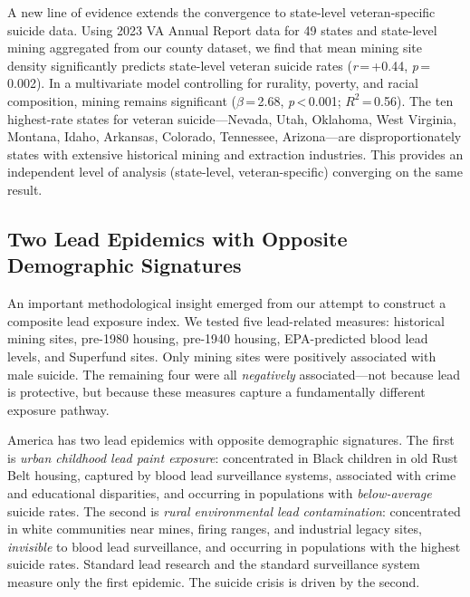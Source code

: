 \documentclass[11pt,twocolumn]{article}
\begin{document}
A new line of evidence extends the convergence to state-level veteran-specific suicide data. Using 2023 VA Annual Report data for 49 states and state-level mining aggregated from our county dataset, we find that mean mining site density significantly predicts state-level veteran suicide rates (\textit{r}\,=\,+0.44, \textit{p}\,=\,0.002). In a multivariate model controlling for rurality, poverty, and racial composition, mining remains significant ($\beta$\,=\,2.68, \textit{p}\,<\,0.001; $R^2$\,=\,0.56). The ten highest-rate states for veteran suicide---Nevada, Utah, Oklahoma, West Virginia, Montana, Idaho, Arkansas, Colorado, Tennessee, Arizona---are disproportionately states with extensive historical mining and extraction industries. This provides an independent level of analysis (state-level, veteran-specific) converging on the same result.

\subsection{Two Lead Epidemics with Opposite Demographic Signatures}

An important methodological insight emerged from our attempt to construct a composite lead exposure index. We tested five lead-related measures: historical mining sites, pre-1980 housing, pre-1940 housing, EPA-predicted blood lead levels, and Superfund sites. Only mining sites were positively associated with male suicide. The remaining four were all \textit{negatively} associated---not because lead is protective, but because these measures capture a fundamentally different exposure pathway.

America has two lead epidemics with opposite demographic signatures. The first is \textit{urban childhood lead paint exposure}: concentrated in Black children in old Rust Belt housing, captured by blood lead surveillance systems, associated with crime and educational disparities, and occurring in populations with \textit{below-average} suicide rates. The second is \textit{rural environmental lead contamination}: concentrated in white communities near mines, firing ranges, and industrial legacy sites, \textit{invisible} to blood lead surveillance, and occurring in populations with the highest suicide rates. Standard lead research and the standard surveillance system measure only the first epidemic. The suicide crisis is driven by the second.
\end{document}
